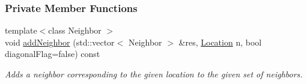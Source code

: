 \subsubsection*{Private Member Functions}
\begin{DoxyCompactItemize}
\item 
{\footnotesize template$<$class Neighbor $>$ }\\void \hyperlink{structslb_1_1ext_1_1explicit__space_1_1Grid_a804425c4377ce2933be9f3ea655dd940}{add\+Neighbor} (std\+::vector$<$ Neighbor $>$ \&res, \hyperlink{structslb_1_1ext_1_1explicit__space_1_1Grid_a2b2125f1774b299ea7f0f9f21d967fde}{Location} n, bool diagonal\+Flag=false) const 
\begin{DoxyCompactList}\small\item\em Adds a neighbor corresponding to the given location to the given set of neighbors. \end{DoxyCompactList}\end{DoxyCompactItemize}
